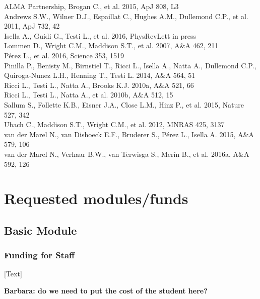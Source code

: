 \documentclass[10pt,fleqn,twoside]{article}
\newcommand{\Tcol}{\color{blue}}
\begin{document}
ALMA Partnership, Brogan C., et al. 2015, ApJ 808, L3\\
Andrews S.W., Wilner D.J., Espaillat C., Hughes A.M., Dullemond C.P., et al. 2011, ApJ 732, 42\\
Isella A., Guidi G., Testi L., et al. 2016, PhysRevLett in press\\
Lommen D., Wright C.M., Maddison S.T., et al. 2007, A\&A 462, 211\\
P\'{e}rez L., et al. 2016, Science 353, 1519\\
Pinilla P., Benisty M., Birnstiel T., Ricci L., Isella A., Natta A., Dullemond C.P., Quiroga-Nunez L.H., Henning T., Testi L. 2014, A\&A 564, 51\\
Ricci L., Testi L., Natta A., Brooks K.J. 2010a, A\&A 521, 66\\
Ricci L., Testi L., Natta A., et al. 2010b, A\&A 512, 15\\
Sallum S., Follette K.B., Eisner J.A., Close L.M., Hinz P., et al. 2015, Nature 527, 342\\
Ubach C., Maddison S.T., Wright C.M., et al. 2012, MNRAS 425, 3137\\
van der Marel N., van Dishoeck E.F., Bruderer S., P\'{e}rez L., Isella A. 2015, A\&A 579, 106\\
van der Marel N., Verhaar B.W., van Terwisga S., Mer\'{i}n B., et al. 2016a, A\&A 592, 126\\

\section{\Tcol Requested modules/funds}
\renewcommand{\leftmark}{\sc  Requested modules/funds}

\subsection{\Tcol Basic Module}

\subsubsection{\Tcol Funding for Staff}

[Text]

{\bf Barbara: do we need to put the cost of the student here?}
\end{document}
